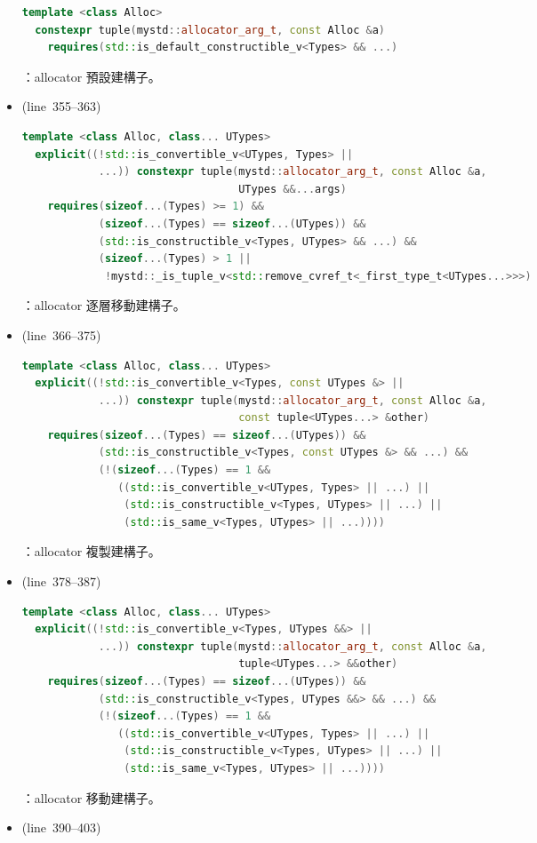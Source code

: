 \documentclass[a4paper,12pt]{article}
\begin{document}
\begin{itemize}
\begin{lstlisting}[language=C++]
  template <class Alloc>
  constexpr tuple(mystd::allocator_arg_t, const Alloc &a)
    requires(std::is_default_constructible_v<Types> && ...)
\end{lstlisting}
：allocator 預設建構子。
\item (line~355--363)
\begin{lstlisting}[language=C++]
  template <class Alloc, class... UTypes>
  explicit((!std::is_convertible_v<UTypes, Types> ||
            ...)) constexpr tuple(mystd::allocator_arg_t, const Alloc &a,
                                  UTypes &&...args)
    requires(sizeof...(Types) >= 1) &&
            (sizeof...(Types) == sizeof...(UTypes)) &&
            (std::is_constructible_v<Types, UTypes> && ...) &&
            (sizeof...(Types) > 1 ||
             !mystd::_is_tuple_v<std::remove_cvref_t<_first_type_t<UTypes...>>>)
\end{lstlisting}
：allocator 逐層移動建構子。
\item (line~366--375)
\begin{lstlisting}[language=C++]
  template <class Alloc, class... UTypes>
  explicit((!std::is_convertible_v<Types, const UTypes &> ||
            ...)) constexpr tuple(mystd::allocator_arg_t, const Alloc &a,
                                  const tuple<UTypes...> &other)
    requires(sizeof...(Types) == sizeof...(UTypes)) &&
            (std::is_constructible_v<Types, const UTypes &> && ...) &&
            (!(sizeof...(Types) == 1 &&
               ((std::is_convertible_v<UTypes, Types> || ...) ||
                (std::is_constructible_v<Types, UTypes> || ...) ||
                (std::is_same_v<Types, UTypes> || ...))))
\end{lstlisting}
：allocator 複製建構子。
\item (line~378--387)
\begin{lstlisting}[language=C++]
  template <class Alloc, class... UTypes>
  explicit((!std::is_convertible_v<Types, UTypes &&> ||
            ...)) constexpr tuple(mystd::allocator_arg_t, const Alloc &a,
                                  tuple<UTypes...> &&other)
    requires(sizeof...(Types) == sizeof...(UTypes)) &&
            (std::is_constructible_v<Types, UTypes &&> && ...) &&
            (!(sizeof...(Types) == 1 &&
               ((std::is_convertible_v<UTypes, Types> || ...) ||
                (std::is_constructible_v<Types, UTypes> || ...) ||
                (std::is_same_v<Types, UTypes> || ...))))
\end{lstlisting}
：allocator 移動建構子。
\item (line~390--403)

\end{itemize}
\end{document}
